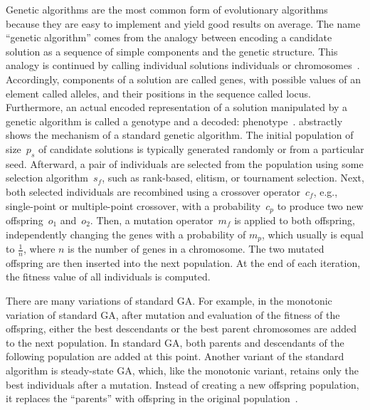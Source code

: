\documentclass[paper=a4,%
  twoside,%
  BCOR4mm,%
  abstract=true,%
  toc=bibliography,%
  chapterprefix=true,%
  toc=bibliographynumbered,%
  open=right,%
  english,%
  pagesize=pdftex]{scrreprt}
\begin{document}
Genetic algorithms are the most common form of evolutionary algorithms because they are easy to implement and yield good results on average. The name ``genetic algorithm'' comes from the analogy between encoding a candidate solution as a sequence of simple components and the genetic structure. This analogy is continued by calling individual solutions individuals or chromosomes~\cite{Campos2017}. Accordingly, components of a solution are called genes, with possible values of an element called alleles, and their positions in the sequence called locus. Furthermore, an actual encoded representation of a solution manipulated by a genetic algorithm is called a genotype and a decoded: phenotype~\cite{McMinn_2004}.  abstractly shows the mechanism of a standard genetic algorithm. The initial population of size~$p_s$ of candidate solutions is typically generated randomly or from a particular seed. Afterward, a pair of individuals are selected from the population using some selection algorithm~$s_f$, such as rank-based, elitism, or tournament selection. Next, both selected individuals are recombined using a crossover operator~$c_f$, e.g., single-point or multiple-point crossover, with a probability~$c_p$ to produce two new offspring~$o_1$ and~$o_2$. Then, a mutation operator~$m_f$ is applied to both offspring, independently changing the genes with a probability of $m_p$, which usually is equal to $\frac{1}{n}$, where $n$ is the number of genes in a chromosome. The two mutated offspring are then inserted into the next population. At the end of each iteration, the fitness value of all individuals is computed.

There are many variations of standard \ac{GA}. For example, in the monotonic variation of standard \ac{GA}, after mutation and evaluation of the fitness of the offspring, either the best descendants or the best parent chromosomes are added to the next population. In standard \ac{GA}, both parents and descendants of the following population are added at this point. Another variant of the standard algorithm is steady-state \ac{GA}, which, like the monotonic variant, retains only the best individuals after a mutation. Instead of creating a new offspring population, it replaces the ``parents'' with offspring in the original population~\cite{Campos2017}.
\end{document}
